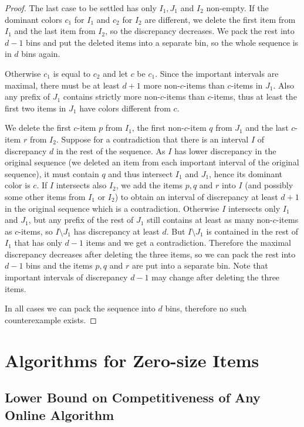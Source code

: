 \documentclass[11pt,a4paper]{article}
\begin{document}
\begin{proof}
The last case to be settled has only $I_1, J_1$ and $I_2$ non-empty. If the dominant colors $c_1$ for $I_1$
and $c_2$ for $I_2$ are different, we delete the first item from $I_1$
and the last item from $I_2$, so the discrepancy decreases.
We pack the rest into $d-1$ bins and put the deleted items into a
separate bin, so the whole sequence is in $d$ bins again.

Otherwise $c_1$ is equal to $c_2$ and let $c$ be $c_1$. Since the important intervals are maximal, there must
be at least $d + 1$ more non-$c$-items than $c$-items in $J_1$.
Also any prefix of $J_1$ contains strictly more non-$c$-items than $c$-items,
thus at least the first two items in $J_1$ have colors different from $c$.

We delete the first $c$-item $p$ from $I_1$, the first non-$c$-item $q$ from $J_1$
and the last $c$-item $r$ from $I_2$.
Suppose for a contradiction that there is an interval $I$ of discrepancy
$d$ in the rest of the sequence. As $I$ has lower discrepancy in the original sequence (we deleted an item from each important interval of the original sequence),
it must contain $q$ and thus intersect $I_1$ and $J_1$, hence its dominant color is $c$.
If $I$ intersects also $I_2$, we add the items $p, q$ and $r$ into $I$
(and possibly some other items from $I_1$ or $I_2$)
to obtain an interval of discrepancy at least $d+1$ in the original sequence which is a contradiction.
Otherwise $I$ intersects only $I_1$ and $J_1$, but any prefix of the rest
of $J_1$ still contains at least as many non-$c$-items as $c$-items,
so $I \setminus J_1$ has discrepancy at least $d$. But $I \setminus J_1$ is contained in 
the rest of $I_1$ that has only $d-1$ items and we get a contradiction.
Therefore the maximal discrepancy decreases after deleting the three items,
so we can pack the rest into $d - 1$ bins and the items $p, q$ and $r$ are put into a separate bin.
Note that important intervals of discrepancy $d - 1$ may change after deleting the three items.

In all cases we can pack the sequence into $d$ bins, therefore no such counterexample exists.
\end{proof}

\section{Algorithms for Zero-size Items}\label{sec:zeroSize}

\subsection{Lower Bound on Competitiveness of Any Online Algorithm}\label{sec:zeroSizeLB}
\end{document}
